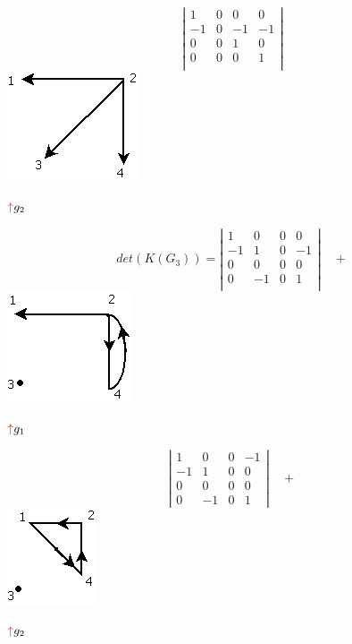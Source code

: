 \documentclass[10pt,a5paper]{book}
\begin{document}
\parbox{6cm}
{
  \vspace*{.5in}
  \[
  \left | \begin{array}{cccc}
      1 & 0 & 0 & 0 \\
      -1 & 0 & -1 & -1 \\
      0 & 0 & 1 & 0 \\
      0 & 0 & 0 & 1 \\
    \end{array}
  \right | \]
  \hspace*{.5in}\includegraphics[scale=.65]{Fig2_6_c2.png}
  \begin{center} $\textcolor{rojo}{\uparrow} g_2$ \end{center}

}\nopagebreak\vfill
\hspace*{-1.1in}\parbox{6cm}
{
  \[
  det (K(G_3)) = \left | \begin{array}{cccc}
      1 & 0 & 0 & 0 \\
      -1 & 1 & 0 & -1 \\
      0 & 0 & 0 & 0 \\
      0 & -1 & 0 & 1 \\
    \end{array}
  \right | \quad + \]
  \hspace*{1in}\includegraphics[scale=.65]{Fig2_6_c3.png}
  \begin{center} $\textcolor{rojo}{\uparrow} g_1$ \end{center}
}
\hspace*{-.3in}\parbox{6cm}
{
  \[
  \left | \begin{array}{cccc}
      1 & 0 & 0 & -1 \\
      -1 & 1 & 0 & 0 \\
      0 & 0 & 0 & 0 \\
      0 & -1 & 0 & 1 
      \end{array}
    \right |\quad+ \]
    \hspace*{.85in}\includegraphics[scale=.675]{Fig2_6_c4.png}
    \begin{center} $\textcolor{rojo}{\uparrow} g_2$ \end{center}
}\vfill
\end{document}
